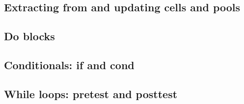 \documentclass{article}
\theoremstyle{definition}
\begin{document}

\subsection{Extracting from and updating cells and pools}



\subsection{Do blocks}


\subsection{Conditionals: if and cond}


\subsection{While loops: pretest and posttest}

\end{document}
